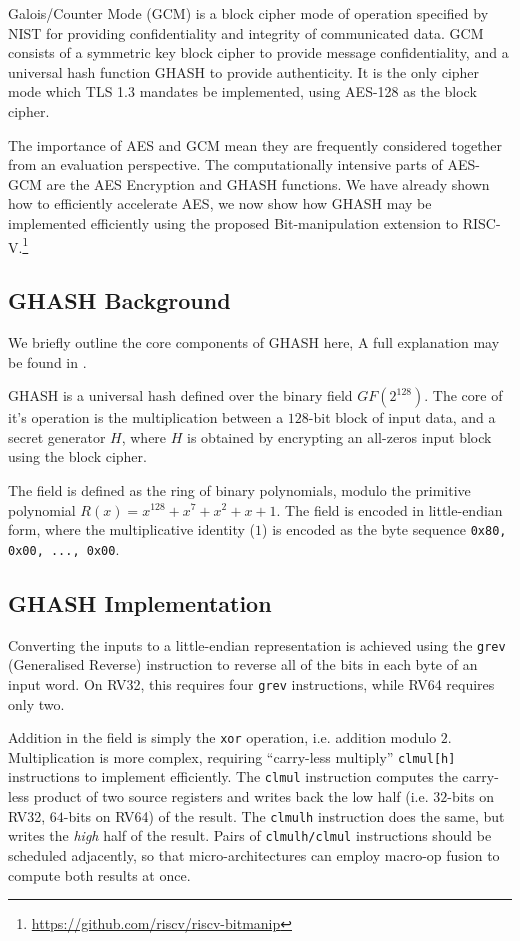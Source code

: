 
Galois/Counter Mode (GCM) is a block cipher mode of operation specified
by NIST\cite{NIST:sp.800.38d} for providing confidentiality and integrity of
communicated data.
GCM consists of a symmetric key block cipher to provide message
confidentiality, and a universal hash function GHASH to provide
authenticity.
It is the only cipher mode which TLS 1.3
\cite[Section 9.1]{rfc:8446}
mandates be implemented, using AES-128 as the block cipher.

The importance of AES and GCM mean they are frequently considered together
from an evaluation perspective.
The computationally intensive parts of AES-GCM are the AES Encryption
and GHASH functions.
We have already shown how to efficiently accelerate AES, we now show
how GHASH may be implemented efficiently using the proposed Bit-manipulation
extension to RISC-V.\footnote{
\url{https://github.com/riscv/riscv-bitmanip}
}

\subsection{GHASH Background}

We briefly outline the core components of GHASH here, A full explanation may
be found in
\cite[Section 6.4]{NIST:sp.800.38d}.

GHASH is a universal hash defined over the binary field $GF(2^{128})$.
The core of it's operation is the multiplication between a $128$-bit
block of input data, and a secret generator $H$, where
$H$ is obtained by encrypting an all-zeros input block using the
block cipher.

The field is defined as the ring of binary polynomials, modulo the
primitive polynomial
$R(x) = x^{128} + x^{7} + x^{2} + x + 1$.
The field is encoded in little-endian form, where the multiplicative
identity ($1$) is encoded as the byte sequence {\tt 0x80, 0x00, ..., 0x00}.

\subsection{GHASH Implementation}

Converting the inputs to a little-endian representation is achieved
using the 
{\tt grev} (Generalised Reverse)
instruction to reverse all of the bits in each byte
of an input word.
On RV32, this requires four {\tt grev} instructions, while RV64 requires
only two.

Addition in the field is simply the {\tt xor} operation, i.e. addition
modulo $2$.
Multiplication is more complex, requiring ``carry-less multiply''
{\tt clmul[h]} instructions to implement efficiently.
The {\tt clmul} instruction computes the carry-less product of two source
registers and writes back the low half
(i.e. $32$-bits on RV32, $64$-bits on RV64)
of the result.
The {\tt clmulh} instruction does the same, but writes the {\em high}
half of the result.
Pairs of {\tt clmulh/clmul} instructions
should be scheduled adjacently, so that micro-architectures can employ
macro-op fusion to compute both results at once.


